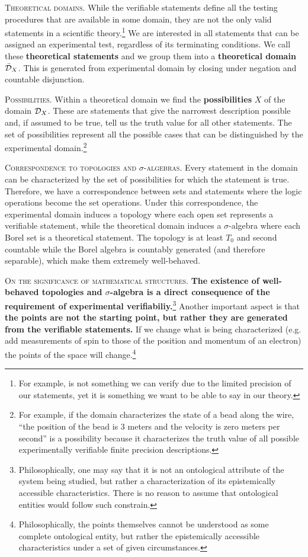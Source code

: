 \documentclass[10pt,twocolumn, nofootinbib]{revtex4-1}
\newcommand\partitle[1]{\textsc{#1}.}
\begin{document}
\partitle{Theoretical domains} While the verifiable statements define all the testing procedures that are available in some domain, they are not the only valid statements in a scientific theory.\footnote{For example,  is not something we can verify due to the limited precision of our statements, yet it is something we want to be able to say in our theory.} We are interested in all statements that can be assigned an experimental test, regardless of its terminating conditions. We call these \textbf{theoretical statements} and we group them into a \textbf{theoretical domain} $\bar{\mathcal{D}}_X$. This is generated from experimental domain by closing under negation and countable disjunction.

\partitle{Possibilities} Within a theoretical domain we find the \textbf{possibilities} $X$ of the domain $\mathcal{D}_X$. These are statements that give the narrowest description possible and, if assumed to be true, tell us the truth value for all other statements. The set of possibilities represent all the possible cases that can be distinguished by the experimental domain.\footnote{For example, if the domain characterizes the state of a bead along the wire, ``the position of the bead is 3 meters and the velocity is zero meters per second'' is a possibility because it characterizes the truth value of all possible experimentally verifiable finite precision descriptions.}

\partitle{Correspondence to topologies and $\sigma$-algebras} Every statement in the domain can be characterized by the set of possibilities for which the statement is true. Therefore, we have a correspondence between sets and statements where the logic operations become the set operations. Under this correspondence, the experimental domain induces a topology where each open set represents a verifiable statement, while the theoretical domain induces a $\sigma$-algebra where each Borel set is a theoretical statement. The topology is at least $T_0$ and second countable while the Borel algebra is countably generated (and therefore separable), which make them extremely well-behaved.

\partitle{On the significance of mathematical structures} \textbf{The existence of well-behaved topologies and $\sigma$-algebra is a direct consequence of the requirement of experimental verifiabiliy.}\footnote{Philosophically, one may say that it is not an ontological attribute of the system being studied, but rather a characterization of its epistemically accessible characteristics. There is no reason to assume that ontological entities would follow such constrain.} Another important aspect is that \textbf{the points are not the starting point, but rather they are generated from the verifiable statements.} If we change what is being characterized (e.g. add measurements of spin to those of the position and momentum of an electron) the points of the space will change.\footnote{Philosophically, the points themselves cannot be understood as some complete ontological entity, but rather the epistemically accessible characteristics under a set of given circumstances.}
\end{document}
